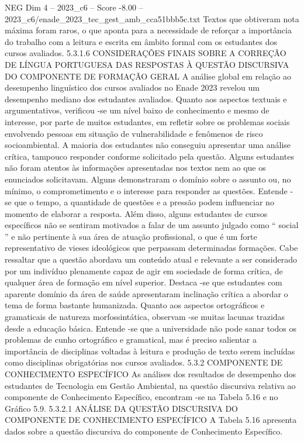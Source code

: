 \begin{textsample}{NEG Dim 4 – 2023\_c6 – Score -8.00 – 2023\_c6/enade\_2023\_tec\_gest\_amb\_cca51bbb5c.txt}
Textos que obtiveram nota máxima foram raros, o que aponta para a necessidade de reforçar a importância do trabalho com a leitura e escrita em âmbito formal com os estudantes dos cursos avaliados. 5.3.1.6 CONSIDERAÇÕES FINAIS SOBRE A CORREÇÃO DE LÍNGUA PORTUGUESA DAS RESPOSTAS À QUESTÃO DISCURSIVA DO COMPONENTE DE FORMAÇÃO GERAL A análise global em relação ao desempenho linguístico dos cursos avaliados no Enade 2023 revelou um desempenho mediano dos estudantes avaliados.
Quanto aos aspectos textuais e argumentativos, verificou -se um nível baixo de conhecimento e mesmo de interesse, por parte de muitos estudantes, em refletir sobre os problemas sociais envolvendo pessoas em situação de vulnerabilidade e fenômenos de risco socioambiental.
A maioria dos estudantes não conseguiu apresentar uma análise crítica, tampouco responder conforme solicitado pela questão.
Alguns estudantes não foram atentos às informações apresentadas nos textos nem ao que os enunciados solicitavam.
Alguns demonstraram o domínio sobre o assunto ou, no mínimo, o comprometimento e o interesse para responder as questões.
Entende -se que o tempo, a quantidade de questões e a pressão podem influenciar no momento de elaborar a resposta.
Além disso, alguns estudantes de cursos específicos não se sentiram motivados a falar de um assunto julgado como “ social ” e não pertinente à sua área de atuação profissional, o que é um forte representativo de vieses ideológicos que perpassam determinadas formações.
Cabe ressaltar que a questão abordava um conteúdo atual e relevante a ser considerado por um indivíduo plenamente capaz de agir em sociedade de forma crítica, de qualquer área de formação em nível superior.
Destaca -se que estudantes com aparente domínio da área de saúde apresentaram inclinação crítica a abordar o tema de forma bastante humanizada.
Quanto aos aspectos ortográficos e gramaticais de natureza morfossintática, observam -se muitas lacunas trazidas desde a educação básica.
Entende -se que a universidade não pode sanar todos os problemas de cunho ortográfico e gramatical, mas é preciso salientar a importância de disciplinas voltadas à leitura e produção de texto serem incluídas como disciplinas obrigatórias nos cursos avaliados. 5.3.2 COMPONENTE DE CONHECIMENTO ESPECÍFICO As análises dos resultados de desempenho dos estudantes de Tecnologia em Gestão Ambiental, na questão discursiva relativa ao componente de Conhecimento Específico, encontram -se na Tabela 5.16 e no Gráfico 5.9. 5.3.2.1 ANÁLISE DA QUESTÃO DISCURSIVA DO COMPONENTE DE CONHECIMENTO ESPECÍFICO A Tabela 5.16 apresenta dados sobre a questão discursiva do componente de Conhecimento Específico.

\end{textsample}
